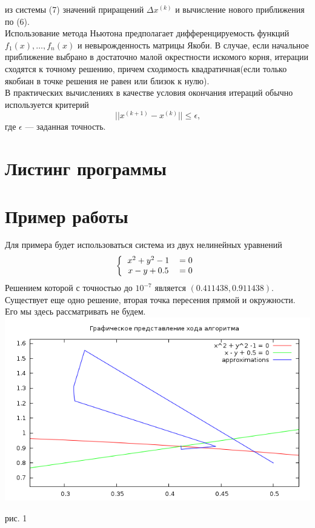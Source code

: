 \documentclass[a4paper, 12pt]{article}
\begin{document}
из системы (7) значений приращений $\Delta x^{(k)}$ и вычисление нового приближения по (6).\\
Использование метода Ньютона предполагает дифференцируемость функций $f_1(x),\ldots ,f_n(x)$ и невырожденность матрицы Якоби. В случае, если 
начальное приближение выбрано в достаточно малой окрестности искомого корня, итерации сходятся к точному решению, причем сходимость квадратичная(если только якобиан в точке решения не равен или близок к нулю).\\
В практических вычислениях в качестве условия окончания итераций обычно используется критерий 
\begin{equation}
	|| x^{(k+1)} - x^{(k)} || \leq \epsilon \text{,}
\end{equation}
где $\epsilon$ --- заданная точность.
\newpage
\section*{Листинг программы}


\newpage
\section*{Пример работы}
Для примера будет использоваться система из двух нелинейных уравнений 
\begin{equation}
	\left\{
		\begin{tabular}{cc}
			$x^2 + y^2 - 1 $&$ = 0$\\
			$x-y+0.5$&$ = 0$
		\end{tabular}
		\right.
\end{equation}
Решением которой с точностью до $10^{-7}$ является $(0.411438, 0.911438)$. Существует еще одно решение, вторая точка пересения прямой и окружности. Его мы
здесь рассматривать не будем.\\
\includegraphics[width=\linewidth]{xs.png}
	\begin{center}
		рис. 1\\
	\end{center}
\end{document}
